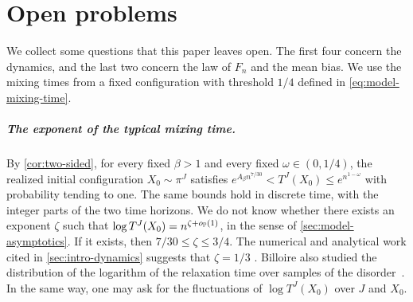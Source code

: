 \chapter{Open problems}\label{sec:open}

We collect some questions that this paper leaves open. The first four concern
the dynamics, and the last two concern the law of $F_n$ and the mean bias.
We use the mixing times from a fixed configuration with threshold $1/4$
defined in \eqref{eq:model-mixing-time}.

\paragraph{The exponent of the typical mixing time.}
By \cref{cor:two-sided}, for every fixed $\beta>1$ and every fixed
$\omega\in(0,1/4)$, the realized initial configuration $X_0\sim\pi^J$
satisfies $e^{A_\beta n^{7/30}}<T^J(X_0)\le e^{n^{1-\omega}}$ with
probability tending to one. The same bounds hold in discrete time, with
the integer parts of the two time horizons. We do not know whether there
exists an exponent $\zeta$ such that $\log T^J(X_0)=n^{\zeta+o_\mathbb P(1)}$, in
the sense of \cref{sec:model-asymptotics}. If it exists, then
$7/30\le\zeta\le3/4$. The numerical and analytical work cited in
\cref{sec:intro-dynamics} suggests that $\zeta=1/3$
\cite{kinzelbach-horner-1991,billoire-marinari-2001,monthus-garel-2009,billoire-2010}.
Billoire also studied the distribution of the logarithm of the relaxation
time over samples of the disorder~\cite{billoire-2010}. In the same way, one
may ask for the fluctuations of $\log T^J(X_0)$ over $J$ and $X_0$.

